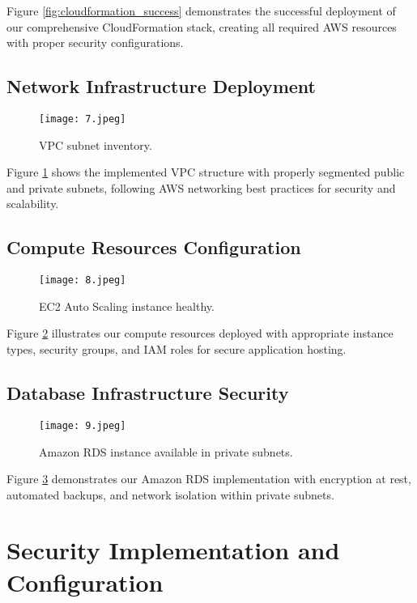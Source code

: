 \documentclass[12pt]{article}
\begin{document}
Figure \ref{fig:cloudformation_success} demonstrates the successful deployment of our comprehensive CloudFormation stack, creating all required AWS resources with proper security configurations.

\subsection{Network Infrastructure Deployment}

\begin{figure}[H]
\centering
\texttt{[image: 7.jpeg]}
\caption{VPC subnet inventory.}
\label{fig:vpc_implementation}
\end{figure}

Figure \ref{fig:vpc_implementation} shows the implemented VPC structure with properly segmented public and private subnets, following AWS networking best practices for security and scalability.

\subsection{Compute Resources Configuration}

\begin{figure}[H]
\centering
\texttt{[image: 8.jpeg]}
\caption{EC2 Auto Scaling instance healthy.}
\label{fig:ec2_deployment}
\end{figure}

Figure \ref{fig:ec2_deployment} illustrates our compute resources deployed with appropriate instance types, security groups, and IAM roles for secure application hosting.

\subsection{Database Infrastructure Security}

\begin{figure}[H]
\centering
\texttt{[image: 9.jpeg]}
\caption{Amazon RDS instance available in private subnets.}
\label{fig:rds_database}
\end{figure}

Figure \ref{fig:rds_database} demonstrates our Amazon RDS implementation with encryption at rest, automated backups, and network isolation within private subnets.

\section{Security Implementation and Configuration}
\end{document}
